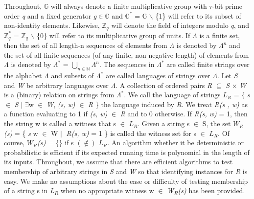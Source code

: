 \documentclass[a4paper]{article}
\begin{document}
Throughout, $\mathbb{G}$ will always denote a finite multiplicative group with  \(\tau\)-bit prime order \emph{q} and a fixed generator \emph{g}\(\in\)$\mathbb{G}$ and $\mathbb{G}^{*}$ = $\mathbb{G}$ \ensuremath{\backslash} \{1\} will refer to its subset of non-identity elements. Likewise, $\mathbb{Z}_q$ will denote the field of integers modulo \emph{q}, and $\mathbb{Z}^{*}_q$ = $\mathbb{Z}_q$ \ensuremath{\backslash} \{0\} will refer to its multiplicative group of units.
\newline
\newline
If \(\Lambda\) is a finite set, then the set of all length-n sequences of elements from \(\Lambda\) is denoted by \(\Lambda^n\) and the set of all finite sequences (of any finite, non-negative length) of elements from \(\Lambda\) is denoted by \(\Lambda^{*}\) = \( \bigcup_{n\in\mathbb{N}} \)\(\Lambda^n\). The sequences in \(\Lambda^{*}\) are called finite strings over the alphabet \(\Lambda\) and subsets of \(\Lambda^{*}\) are called languages of strings over \(\Lambda\). Let \textit{S} and \textit{W} be arbitrary languages over \(\Lambda\). A collection of ordered pairs \textit{R} \(\subseteq\) \textit{S} \(\times\) \textit{W} is a (binary) relation on strings from \(\Lambda^{*}\). We call the language of strings \textit{$L_R$} {=} \{ \textit{s} $\in$ \textit{S} \(\mid\) \(\exists\)w $\in$ \textit{W}, \textit{(s, w)} $\in$ \textit{R} \} the language induced by \textit{R}. We treat \textit{R(s , w)} as a function evaluating to 1 if \textit{(s, w)} $\in$ \textit{R} and to 0 otherwise. If \textit{R(s, w)} = 1, then the string w is called a witness that s $\in$ \textit{$L_R$}. Given a string s $\in$ S, the set \textit{$W_R$(s)} {=} \{ \textit{s} w $\in$ W \(\mid\) \textit{R(s, w)} {=} 1 \} is called the witness set for s $\in$ \textit{$L_R$}. Of course, \textit{$W_R$(s)} = \{\} if s $(\notin)$ \textit{$L_R$}.
\newline
An algorithm whether it be deterministic or probabilistic is efficient if its expected running time is polynomial in the length of its inputs.
\newline
Throughout, we assume that there are efficient algorithms to test membership of arbitrary strings in \textit{S} and \textit{W} so that identifying instances for \textit{R} is easy. 
\newline
We make no assumptions about the ease or difficulty of testing membership of a string s in \textit{L\textsubscript{R}} when no appropriate witness w $\in$ \textit{W\textsubscript{R}(s)} has been provided.
\newline
\end{document}

